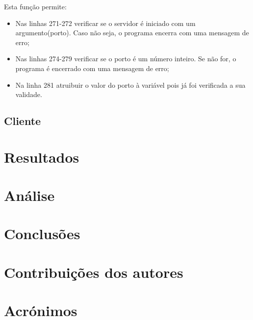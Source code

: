 \documentclass{report}
\begin{document}
Esta função permite:
\begin{itemize}
\item Nas linhas 271-272 verificar se o servidor é iniciado com um argumento(porto). Caso não seja, o programa encerra com uma mensagem de erro;
\item Nas linhas 274-279 verificar se o porto é um número inteiro. Se não for, o programa é encerrado com uma mensagem de erro;
\item Na linha 281 atruibuir o valor do porto à variável pois já foi verificada a sua validade.
\end{itemize}

\section{Cliente}



\chapter{Resultados}
\label{chap.resultados}

\chapter{Análise}
\label{chap.analise}


\chapter{Conclusões}
\label{chap.conclusao}

\chapter*{Contribuições dos autores}


\chapter*{Acrónimos}


\printbibliography
\end{document}
